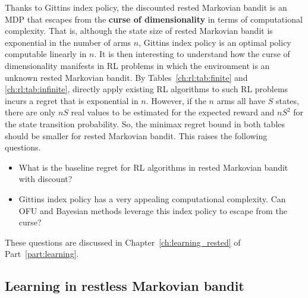 Thanks to Gittins index policy, the discounted rested Markovian bandit is an MDP that escapes from the \textbf{curse of dimensionality} in terms of computational complexity.
That is, although the state size of rested Markovian bandit is exponential in the number of arms $n$, Gittins index policy is an optimal policy computable linearly in $n$.
It is then interesting to understand how the curse of dimensionality manifests in RL problems in which the environment is an unknown rested Markovian bandit.
By Tables~\ref{ch:rl:tab:finite} and \ref{ch:rl:tab:infinite}, directly apply existing RL algorithms to such RL problems incurs a regret that is exponential in $n$.
However, if the $n$ arms all have $S$ states, there are only $nS$ real values to be estimated for the expected reward and $nS^2$ for the state transition probability.
So, the minimax regret bound in both tables should be smaller for rested Markovian bandit.
This raises the following questions.
\begin{itemize}
    \item What is the baseline regret for RL algorithms in rested Markovian bandit with discount?
    \item Gittins index policy has a very appealing computational complexity. Can OFU and Bayesian methods leverage this index policy to escape from the curse?
\end{itemize}
These questions are discussed in Chapter~\ref{ch:learning_rested} of Part~\ref{part:learning}.

\subsection{Learning in restless Markovian bandit}

